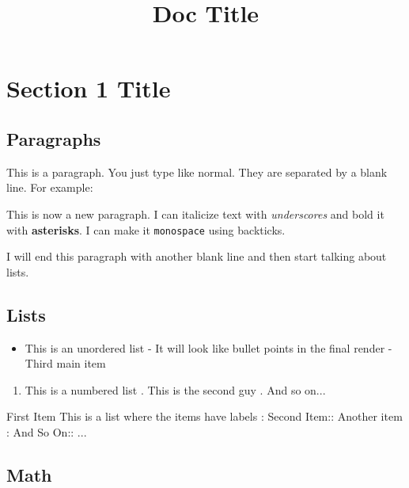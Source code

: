 \message{ !name(target.tex)}\documentclass[12pt]{article}
\title{Doc Title}
\begin{document}

\maketitle
\tableofcontents

\section{Section 1 Title}


\subsection{Paragraphs}


This is a paragraph.  You just type like normal.  They are separated
by a blank line.  For example:

This is now a new paragraph.  I can italicize text with \emph{underscores}
and bold it with \textbf{asterisks}.  I can make it \texttt{monospace} using
backticks.

I will end this paragraph with another blank line and then start
talking about lists.


\subsection{Lists}


\begin{itemize}
\item This is an unordered list
- It will look like bullet points in the final render
- Third main item
\end{itemize}

\begin{enumerate}
\item This is a numbered list
. This is the second guy
. And so on...
\end{enumerate}

\begin{description}
\item{First Item} This is a list where the items have labels
: Second Item:: Another item
: And So On:: ...
\end{description}

\subsection{Math}
\end{document}

